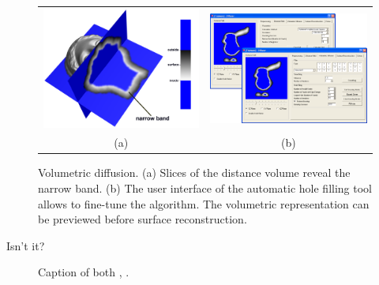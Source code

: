 \begin{figure}
    \centering
    \setlength{\tabcolsep}{0.0130\linewidth}
    \begin{tabular}{@{}cc@{}}
    \includegraphics[width=0.487\linewidth]{Figures/IgeaNarrowBand}&
    \includegraphics[width=0.487\linewidth]{Figures/voldiff_ui}\\
    (a)&(b)\\
    \end{tabular}
    \caption[Volumetric diffusion]{Volumetric diffusion.
    	  \textup{(a)} Slices of the distance volume reveal the narrow band.
			  \textup{(b)} The user interface of the automatic hole filling
        tool allows to fine-tune the algorithm.
        The volumetric representation can be previewed before
        surface reconstruction.%
      \label{fig:voldiff}}
\end{figure}
%
Isn't it?

\begin{figure}[!htb]
	\centering
	 \hfill
	\caption[Caption both]{Caption of both , .}
	\label{fig:bothfigures}
\end{figure}


